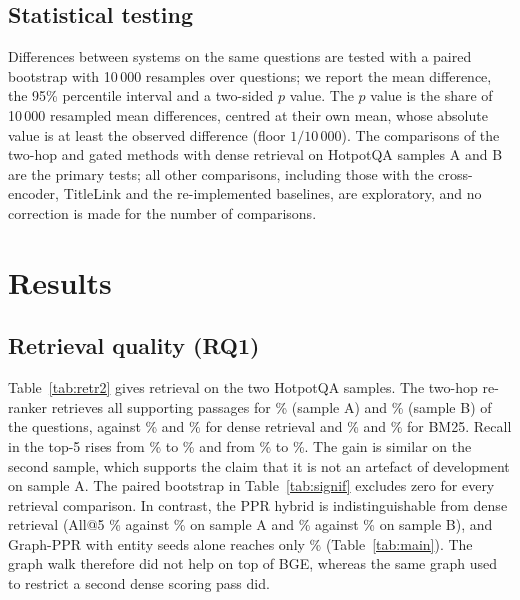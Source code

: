 \documentclass[a4paper,fleqn]{cas-sc}
\begin{document}
\subsection{Statistical testing}
Differences between systems on the same questions are tested with a paired bootstrap \citep{efron1979bootstrap,berg2012bootstrap,koehn2004signif} with 10\,000 resamples over questions; we report the mean difference, the 95\% percentile interval and a two-sided $p$ value. The $p$ value is the share of 10\,000 resampled mean differences, centred at their own mean, whose absolute value is at least the observed difference (floor $1/10\,000$). The comparisons of the two-hop and gated methods with dense retrieval on HotpotQA samples A and B are the primary tests; all other comparisons, including those with the cross-encoder, TitleLink and the re-implemented baselines, are exploratory, and no correction is made for the number of comparisons.

\section{Results}\label{sec:results}

\subsection{Retrieval quality (RQ1)}
Table~\ref{tab:retr2} gives retrieval on the two HotpotQA samples. The two-hop re-ranker retrieves all supporting passages for \RSampleAHybridTwoAllSupp\% (sample A) and \RSampleBHybridTwoAllSupp\% (sample B) of the questions, against \RSampleADenseAllSupp\% and \RSampleBDenseAllSupp\% for dense retrieval and \RSampleABmTwoAllSupp\% and \RSampleBBmTwoAllSupp\% for BM25. Recall in the top-5 rises from \RSampleADenseRecall\% to \RSampleAHybridTwoRecall\% and from \RSampleBDenseRecall\% to \RSampleBHybridTwoRecall\%. The gain is similar on the second sample, which supports the claim that it is not an artefact of development on sample A. The paired bootstrap in Table~\ref{tab:signif} excludes zero for every retrieval comparison. In contrast, the PPR hybrid is indistinguishable from dense retrieval (All@5 \RSampleAHybridAllSupp\% against \RSampleADenseAllSupp\% on sample A and \RSampleBHybridAllSupp\% against \RSampleBDenseAllSupp\% on sample B), and Graph-PPR with entity seeds alone reaches only \RHotpotQAGraphAllSupp\% (Table~\ref{tab:main}). The graph walk therefore did not help on top of BGE, whereas the same graph used to restrict a second dense scoring pass did.
\end{document}

